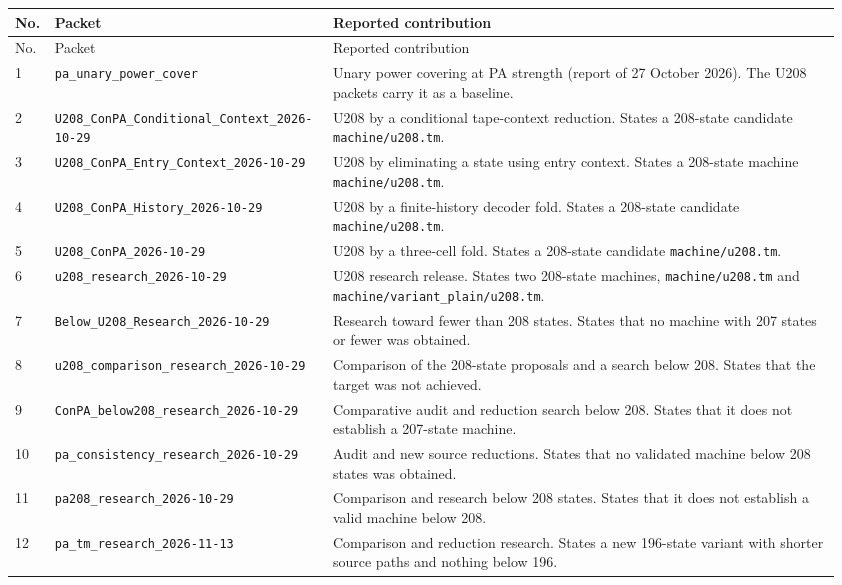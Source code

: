 \begingroup
\small\raggedright\setlength{\tabcolsep}{3pt}
\begin{longtable}{@{}p{0.035\linewidth}p{0.325\linewidth}p{0.60\linewidth}@{}}
\toprule
No. & Packet & Reported contribution\\\midrule\endfirsthead
\toprule
No. & Packet & Reported contribution\\\midrule\endhead
1 & \nolinkurl{pa_unary_power_cover} & Unary power covering at PA strength (report of 27 October 2026). The U208 packets carry it as a baseline.\\[5pt]
2 & \nolinkurl{U208_ConPA_Conditional_Context_2026-10-29} & U208 by a conditional tape-context reduction. States a 208-state candidate \nolinkurl{machine/u208.tm}.\\[5pt]
3 & \nolinkurl{U208_ConPA_Entry_Context_2026-10-29} & U208 by eliminating a state using entry context. States a 208-state machine \nolinkurl{machine/u208.tm}.\\[5pt]
4 & \nolinkurl{U208_ConPA_History_2026-10-29} & U208 by a finite-history decoder fold. States a 208-state candidate \nolinkurl{machine/u208.tm}.\\[5pt]
5 & \nolinkurl{U208_ConPA_2026-10-29} & U208 by a three-cell fold. States a 208-state candidate \nolinkurl{machine/u208.tm}.\\[5pt]
6 & \nolinkurl{u208_research_2026-10-29} & U208 research release. States two 208-state machines, \nolinkurl{machine/u208.tm} and \nolinkurl{machine/variant_plain/u208.tm}.\\[5pt]
7 & \nolinkurl{Below_U208_Research_2026-10-29} & Research toward fewer than 208 states. States that no machine with 207 states or fewer was obtained.\\[5pt]
8 & \nolinkurl{u208_comparison_research_2026-10-29} & Comparison of the 208-state proposals and a search below 208. States that the target was not achieved.\\[5pt]
9 & \nolinkurl{ConPA_below208_research_2026-10-29} & Comparative audit and reduction search below 208. States that it does not establish a 207-state machine.\\[5pt]
10 & \nolinkurl{pa_consistency_research_2026-10-29} & Audit and new source reductions. States that no validated machine below 208 states was obtained.\\[5pt]
11 & \nolinkurl{pa208_research_2026-10-29} & Comparison and research below 208 states. States that it does not establish a valid machine below 208.\\[5pt]
12 & \nolinkurl{pa_tm_research_2026-11-13} & Comparison and reduction research. States a new 196-state variant with shorter source paths and nothing below 196.\\[5pt]

\end{longtable}
